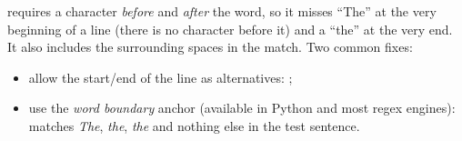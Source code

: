 \begin{nbwarning}
 requires a character
\emph{before} and \emph{after} the word, so it misses ``The'' at the very beginning of a
line (there is no character before it) and a ``the'' at the very end. It also includes
the surrounding spaces in the match. Two common fixes:
\begin{itemize}[nosep]
  \item allow the start/end of the line as alternatives:
        ;
  \item use the \emph{word boundary} anchor  (available in Python
        and most regex engines):  matches
        \emph{The}, \emph{the}, \emph{the} and nothing else in the test sentence.
\end{itemize}
\end{nbwarning}

